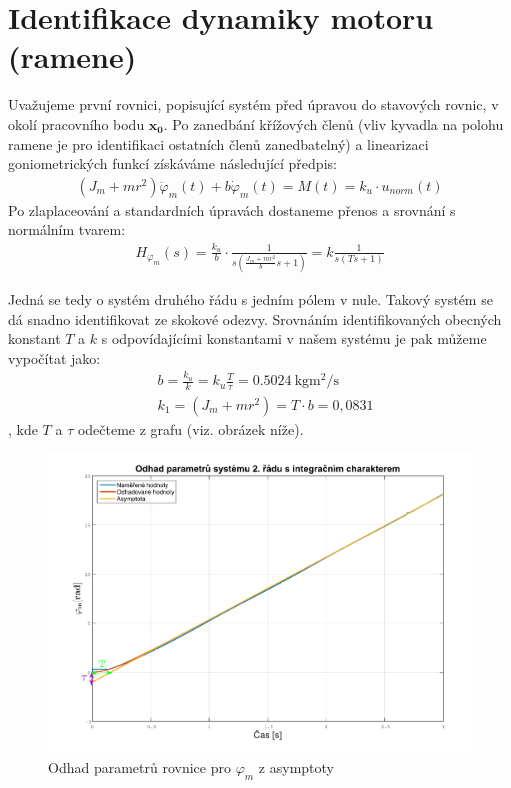 \documentclass[11pt,a4paper]{article}
\begin{document}
\section{Identifikace dynamiky motoru (ramene)}
Uvažujeme první rovnici, popisující systém před úpravou do stavových rovnic, v okolí pracovního bodu $\mathbf{x_0}$. Po zanedbání křížových členů (vliv kyvadla na polohu ramene je pro identifikaci ostatních členů zanedbatelný) a linearizaci goniometrických funkcí získáváme následující předpis:
\begin{align*}
(J_m + mr^2)\ddot{\varphi}_m(t) + b\dot{\varphi}_m(t) = M(t) = k_u\cdot u_{norm}(t)
\end{align*}
Po zlaplaceování a standardních úpravách dostaneme přenos a srovnání s normálním tvarem:
\begin{align*}
H_{\varphi_m}(s) = \frac{k_u}{b}\cdot \frac{1}{s(\frac{J_m + mr^2}{b}s + 1)} = k\frac{1}{s(Ts + 1)}
\end{align*}




Jedná se tedy o systém druhého řádu s jedním pólem v nule. Takový systém se dá snadno identifikovat ze skokové odezvy. Srovnáním identifikovaných obecných konstant $T$ a $k$ s odpovídajícími konstantami v našem systému je pak můžeme vypočítat jako:
\begin{align*}
&b = \frac{k_u}{k} = k_u\frac{T}{\tau} = \SI{0,5024}{\kilo \gram \meter \squared \per \second}	\\
&k_1 = (J_m + mr^2) = T\cdot b = 0,0831
\end{align*}
, kde $T$ a $\tau$ odečteme z grafu (viz. obrázek níže).
\begin{figure}[H]
	\centering
    \includegraphics[scale=.4]{Odhad_phim}
    \caption{Odhad parametrů rovnice pro $\varphi_m$ z asymptoty}
\end{figure}
\end{document}
